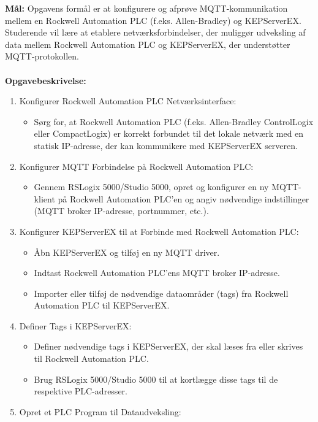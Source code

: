 \textbf{Mål:} Opgavens formål er at konfigurere og afprøve MQTT-kommunikation mellem en Rockwell Automation PLC (f.eks. Allen-Bradley) og KEPServerEX. Studerende vil lære at etablere netværksforbindelser, der muliggør udveksling af data mellem Rockwell Automation PLC og KEPServerEX, der understøtter MQTT-protokollen.
\\\\
\noindent\textbf{Opgavebeskrivelse:}
\begin{enumerate}
	\item Konfigurer Rockwell Automation PLC Netværksinterface:
	\begin{itemize}
		\item Sørg for, at Rockwell Automation PLC (f.eks. Allen-Bradley ControlLogix eller CompactLogix) er korrekt forbundet til det lokale netværk med en statisk IP-adresse, der kan kommunikere med KEPServerEX serveren.
	\end{itemize}
	\item Konfigurer MQTT Forbindelse på Rockwell Automation PLC:
	\begin{itemize}
		\item Gennem RSLogix 5000/Studio 5000, opret og konfigurer en ny MQTT-klient på Rockwell Automation PLC'en og angiv nødvendige indstillinger (MQTT broker IP-adresse, portnummer, etc.).
	\end{itemize}
	\item Konfigurer KEPServerEX til at Forbinde med Rockwell Automation PLC:
	\begin{itemize}
		\item Åbn KEPServerEX og tilføj en ny MQTT driver.
		\item Indtast Rockwell Automation PLC’ens MQTT broker IP-adresse.
		\item Importer eller tilføj de nødvendige dataområder (tags) fra Rockwell Automation PLC til KEPServerEX.
	\end{itemize}
	\item Definer Tags i KEPServerEX:
	\begin{itemize}
		\item Definer nødvendige tags i KEPServerEX, der skal læses fra eller skrives til Rockwell Automation PLC.
		\item Brug RSLogix 5000/Studio 5000 til at kortlægge disse tags til de respektive PLC-adresser.
	\end{itemize}
	\item Opret et PLC Program til Dataudveksling:
	\begin{itemize}

\end{itemize}
\end{enumerate}
